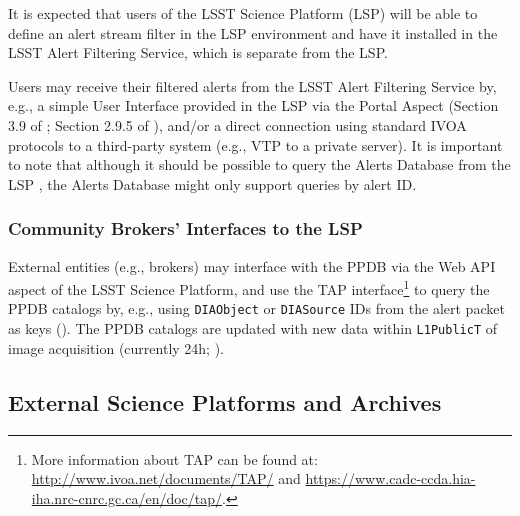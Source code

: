 It is expected that users of the LSST Science Platform (LSP) will be able to define an alert stream filter in the LSP environment and have it installed in the LSST Alert Filtering Service, which is separate from the LSP.

Users may receive their filtered alerts from the LSST Alert Filtering Service by, e.g., a simple User Interface provided in the LSP via the Portal Aspect (Section 3.9 of \citealt{LDM-542}; Section 2.9.5 of \citealt{LDM-554}), and/or a direct connection using standard IVOA protocols to a third-party system (e.g., VTP to a private server).
It is important to note that although it should be possible to query the Alerts Database from the LSP \citep{LDM-542}, the Alerts Database might only support queries by alert ID. 

\subsubsection{Community Brokers' Interfaces to the LSP}\label{sssec:interfaces_lsp_brokers}

External entities (e.g., brokers) may interface with the PPDB via the Web API aspect of the LSST Science Platform, and use the TAP interface\footnote{More information about TAP can be found at: \url{http://www.ivoa.net/documents/TAP/} and \url{https://www.cadc-ccda.hia-iha.nrc-cnrc.gc.ca/en/doc/tap/}.} to query the PPDB catalogs by, e.g., using {\tt DIAObject} or {\tt DIASource} IDs from the alert packet as keys (\citealt{LSE-319,LDM-542,LDM-554}).
The PPDB catalogs are updated with new data within {\tt L1PublicT} of image acquisition (currently 24h; \citealt{LSE-29}). 


\subsection{External Science Platforms and Archives}\label{ssec:interfaces_other}

